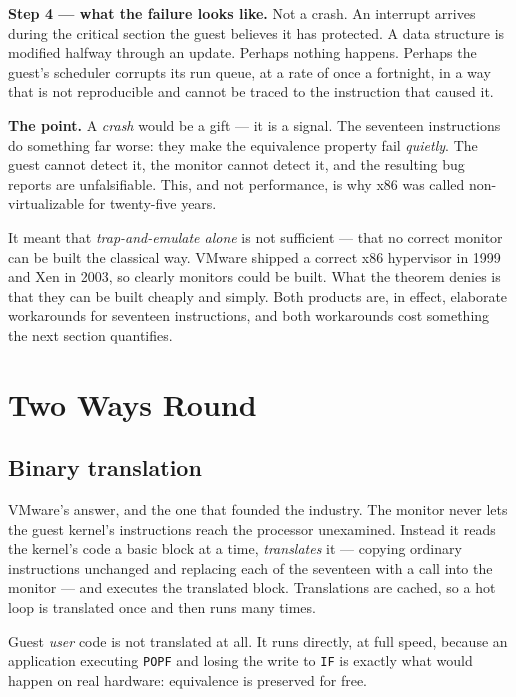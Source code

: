 \begin{worked}
\smallskip
\textbf{Step 4 --- what the failure looks like.} Not a crash. An interrupt
arrives during the critical section the guest believes it has protected. A data
structure is modified halfway through an update. Perhaps nothing happens. Perhaps
the guest's scheduler corrupts its run queue, at a rate of once a fortnight, in
a way that is not reproducible and cannot be traced to the instruction that
caused it.

\smallskip
\textbf{The point.} A \emph{crash} would be a gift --- it is a signal. The
seventeen instructions do something far worse: they make the equivalence
property fail \emph{quietly}. The guest cannot detect it, the monitor cannot
detect it, and the resulting bug reports are unfalsifiable. This, and not
performance, is why x86 was called non-virtualizable for twenty-five years.
\end{worked}

\begin{alertbox}
It meant that \emph{trap-and-emulate alone} is not sufficient --- that no
correct monitor can be built the classical way. VMware shipped a correct x86
hypervisor in 1999 and Xen in 2003, so clearly monitors could be built. What
the theorem denies is that they can be built cheaply and simply. Both products
are, in effect, elaborate workarounds for seventeen instructions, and both
workarounds cost something the next section quantifies.
\end{alertbox}

\section{Two Ways Round}

\subsection{Binary translation}

VMware's answer, and the one that founded the industry. The monitor never lets
the guest kernel's instructions reach the processor unexamined. Instead it
reads the kernel's code a basic block at a time, \emph{translates} it ---
copying ordinary instructions unchanged and replacing each of the seventeen
with a call into the monitor --- and executes the translated block. Translations
are cached, so a hot loop is translated once and then runs many times.

Guest \emph{user} code is not translated at all. It runs directly, at full
speed, because an application executing \texttt{POPF} and losing the write to
\texttt{IF} is exactly what would happen on real hardware: equivalence is
preserved for free.


